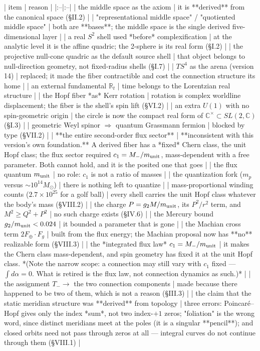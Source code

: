 | item | reason |
|:--|:--|
| the middle space as the axiom | it is **derived** from the canonical space (§II.2) |
| "representational middle space" / "quotiented middle space" | both are **bases**; the middle space is the single derived five-dimensional layer |
| a real $S^2$ shell used *before* complexification | at the analytic level it is the affine quadric; the 2-sphere is its real form (§I.2) |
| the projective null-cone quadric as the default source shell | that object belongs to null-direction geometry, not fixed-radius shells (§I.7) |
| $TS^4$ as the arena (version 14) | replaced; it made the fiber contractible and cost the connection structure its home |
| an external fundamental $\mathbb{R}_t$ | time belongs to the Lorentzian real structure |
| the Hopf fiber *as* Kerr rotation | rotation is complex worldline displacement; the fiber is the shell's spin lift (§VI.2) |
| an extra $U(1)$ with no spin-geometric origin | the circle is now the compact real form of $\mathbb{C}^\times\subset SL(2,\mathbb{C})$ (§I.3) |
| geometric Weyl spinor $\Rightarrow$ quantum Grassmann fermion | blocked by type (§VII.2) |
| **the entire second-order flux sector** | **inconsistent with this version's own foundation.** A derived fiber has a *fixed* Chern class, the unit Hopf class; the flux sector required $c_1 = M_-/m_{\rm unit}$, mass-dependent with a free parameter. Both cannot hold, and it is the posited one that goes |
| the flux quantum $m_{\rm unit}$ | no role: $c_1$ is not a ratio of masses |
| the quantization fork ($m_p$ versus $\sim10^{14}M_\odot$) | there is nothing left to quantize |
| mass-proportional winding counts ($2.7\times10^{25}$ for a golf ball) | every shell carries the unit Hopf class whatever the body's mass (§VIII.2) |
| the charge $P = g_2M/m_{\rm unit}$, its $P^2/r^2$ term, and $M^2\geq Q^2+P^2$ | no such charge exists (§IV.6) |
| the Mercury bound $g_2/m_{\rm unit}<0.024$ | it bounded a parameter that is gone |
| the Machian cross term $2F_\oplus\!\cdot\!F_g$ | built from the flux energy; the Machian proposal now has **no** realizable form (§VIII.3) |
| the *integrated flux law* $c_1 = M_-/m_{\rm unit}$ | it makes the Chern class mass-dependent, and spin geometry has fixed it at the unit Hopf class. *(Note the narrow scope: a connection may still vary with $c_1$ fixed — $\int d\alpha = 0$. What is retired is the flux law, not connection dynamics as such.)* |
| the assignment $T_-\to$ the two connection components | made because there happened to be two of them, which is not a reason (§III.3) |
| the claim that the static meridian structure was **derived** from topology | three errors: Poincaré–Hopf gives only the index *sum*, not two index-$+1$ zeros; "foliation" is the wrong word, since distinct meridians meet at the poles (it is a singular **pencil**); and closed orbits need not pass through zeros at all — integral curves do not continue through them (§VIII.1) |
